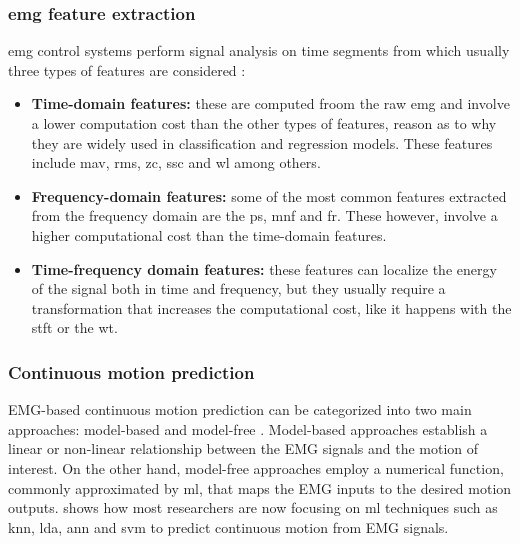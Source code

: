 \subsubsection{\acrshort{emg} feature extraction}

\acrshort{emg} control systems perform signal analysis on time segments from which usually three types of features are considered \cite{EMGprediction}:
\begin{itemize}
    \item \textbf{Time-domain features:} these are computed froom the raw \acrfull{emg} and involve a lower computation cost than the other types of features,
    reason as to why they are widely used in classification and regression models. These features include \acrfull{mav}, \acrfull{rms}, \acrfull{zc}, \acrfull{ssc} and \acrfull{wl}
    among others.
    \item \textbf{Frequency-domain features:} some of the most common features extracted from the frequency domain are the \acrfull{ps}, \acrfull{mnf} and \acrfull{fr}.
    These however, involve a higher computational cost than the time-domain features.
    \item \textbf{Time-frequency domain features:} these features can localize the energy of the signal both in time and frequency, but they usually
    require a transformation that increases the computational cost, like it happens with the \acrfull{stft} or the \acrfull{wt}.
\end{itemize}

\subsubsection{Continuous motion prediction}

EMG-based continuous motion prediction can be categorized into two main approaches: model-based and model-free \cite{EMGprediction}. Model-based approaches
establish a linear or non-linear relationship between the EMG signals and the motion of interest. On the other hand, model-free approaches
employ a numerical function, commonly approximated by \acrshort{ml}, that maps the EMG inputs to the desired motion outputs. \cite{ANNFuzzy} shows how most 
researchers are now focusing on \acrshort{ml} techniques such as \acrshort{knn}, \acrshort{lda}, \acrshort{ann} and \acrshort{svm} to predict continuous motion from EMG signals.


